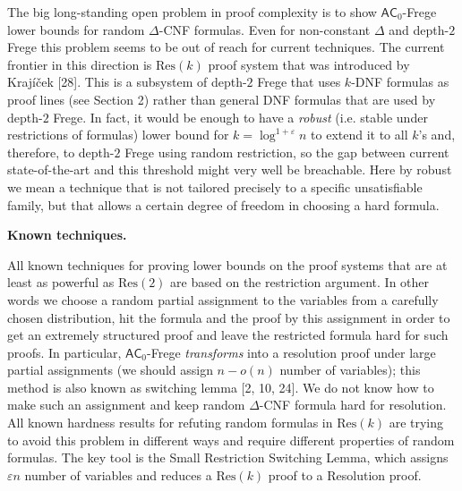 \documentclass[10pt,a4paper]{article}
\begin{document}
The big long-standing open problem in proof complexity is to show ${\mathsf{AC}}_{0}$-Frege lower bounds for random
$\Delta$-CNF formulas. Even for non-constant $\Delta$ and depth-$2$ Frege this problem seems to be out of
reach for current techniques. The current frontier in this direction is $\mathrm{Res}(k)$ proof system that was
introduced by Krajíček [28]. This is a subsystem of depth-$2$ Frege that uses
$k$-DNF formulas as proof lines (see Section 2) rather than general DNF formulas that are
used by depth-$2$ Frege. In fact, it would be enough to have a \emph{robust} (i.e. stable under
restrictions of formulas) lower bound for $k=\log^{1+\varepsilon}n$ to extend it to all $k$’s and,
therefore, to depth-$2$ Frege using random restriction, so the gap between current state-of-the-art and
this threshold might very well be breachable. Here by robust we mean a technique that is not tailored
precisely to a specific unsatisfiable family, but that allows a certain degree of freedom in choosing a
hard formula.\par




\par\medskip\noindent\textbf{Known techniques.}\par




All known techniques for proving lower bounds on the proof systems that
are at least as powerful as $\mathrm{Res}(2)$ are based on the restriction argument. In other words we choose a
random partial assignment to the variables from a carefully chosen distribution, hit the formula and the
proof by this assignment in order to get an extremely structured proof and leave the restricted formula
hard for such proofs. In particular, ${\mathsf{AC}}_{0}$-Frege \emph{transforms} into a resolution proof under large
partial assignments (we should assign $n-o(n)$ number of variables); this method is also known as
switching lemma [2, 10, 24]. We do not know how to make such an assignment and keep
random $\Delta$-CNF formula hard for resolution. All known hardness results for refuting random formulas
in $\mathrm{Res}(k)$ are trying to avoid this problem in different ways and require different properties of
random formulas. The key tool is the Small Restriction Switching Lemma, which assigns $\varepsilon n$
number of variables and reduces a $\mathrm{Res}(k)$ proof to a Resolution proof.\par
\end{document}
